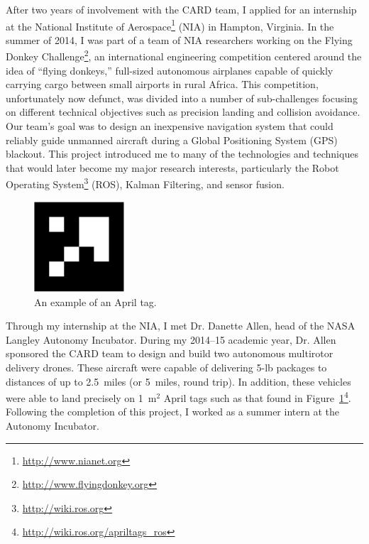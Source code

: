 After two years of involvement with the CARD team, I applied for an internship at the National Institute of Aerospace\footnote{\url{http://www.nianet.org}} (NIA) in Hampton, Virginia. In the summer of 2014, I was part of a team of NIA researchers working on the Flying Donkey Challenge\footnote{\url{http://www.flyingdonkey.org}}, an international engineering competition centered around the idea of ``flying donkeys,'' full-sized autonomous airplanes capable of quickly carrying cargo between small airports in rural Africa. This competition, unfortunately now defunct, was divided into a number of sub-challenges focusing on different technical objectives such as precision landing and collision avoidance. Our team's goal was to design an inexpensive navigation system that could reliably guide unmanned aircraft during a Global Positioning System (GPS) blackout. This project introduced me to many of the technologies and techniques that would later become my major research interests, particularly the Robot Operating System\footnote{\url{http://wiki.ros.org}} (ROS), Kalman Filtering, and sensor fusion.

\begin{figure}
  \centering
    \includegraphics[width=0.3\textwidth]{april_tag}
  \caption[Example April tag]{An example of an April tag.}
  \label{fig:april_tag}
\end{figure}

Through my internship at the NIA, I met Dr. Danette Allen, head of the NASA Langley Autonomy Incubator. During my 2014--15 academic year, Dr. Allen sponsored the CARD team to design and build two autonomous multirotor delivery drones. These aircraft were capable of delivering 5-lb packages to distances of up to 2.5~miles (or 5~miles, round trip). In addition, these vehicles were able to land precisely on 1~m$^2$ April tags such as that found in Figure~\ref{fig:april_tag}\footnote{\url{http://wiki.ros.org/apriltags\_ros}}. Following the completion of this project, I worked as a summer intern at the Autonomy Incubator.

